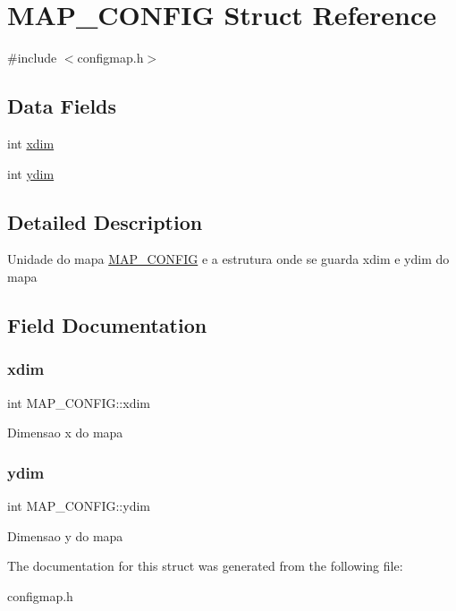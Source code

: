 \hypertarget{struct_m_a_p___c_o_n_f_i_g}{}\section{M\+A\+P\+\_\+\+C\+O\+N\+F\+IG Struct Reference}
\label{struct_m_a_p___c_o_n_f_i_g}


{\ttfamily \#include $<$configmap.\+h$>$}

\subsection*{Data Fields}
\begin{DoxyCompactItemize}
\item 
int \mbox{\hyperlink{struct_m_a_p___c_o_n_f_i_g_ade8a779165793714b9b147dc357afc4c}{xdim}}
\item 
int \mbox{\hyperlink{struct_m_a_p___c_o_n_f_i_g_a5da3acf63cab314c37da2568328fdc8f}{ydim}}
\end{DoxyCompactItemize}


\subsection{Detailed Description}
Unidade do mapa \mbox{\hyperlink{struct_m_a_p___c_o_n_f_i_g}{M\+A\+P\+\_\+\+C\+O\+N\+F\+IG}} e a estrutura onde se guarda xdim e ydim do mapa 

\subsection{Field Documentation}
\mbox{\label{struct_m_a_p___c_o_n_f_i_g_ade8a779165793714b9b147dc357afc4c}} 
\subsubsection{\texorpdfstring{xdim}{xdim}}
{\footnotesize\ttfamily int M\+A\+P\+\_\+\+C\+O\+N\+F\+I\+G\+::xdim}

Dimensao x do mapa \mbox{\label{struct_m_a_p___c_o_n_f_i_g_a5da3acf63cab314c37da2568328fdc8f}} 
\subsubsection{\texorpdfstring{ydim}{ydim}}
{\footnotesize\ttfamily int M\+A\+P\+\_\+\+C\+O\+N\+F\+I\+G\+::ydim}

Dimensao y do mapa 

The documentation for this struct was generated from the following file\+:\begin{DoxyCompactItemize}
\item 
configmap.\+h\end{DoxyCompactItemize}
